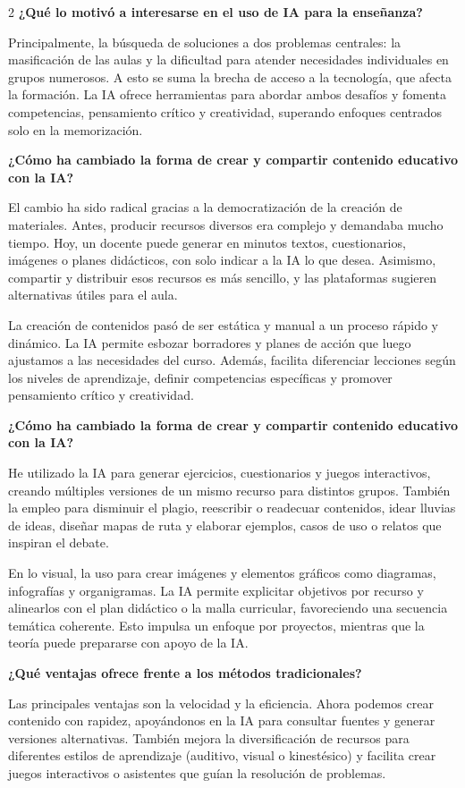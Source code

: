 \documentclass[12pt,spanish,Letterpaper,openany]{book}
\begin{document}
\begin {multicols}{2}
\textbf{¿Qué lo motivó a interesarse en el uso de IA para la enseñanza?}

Principalmente, la búsqueda de soluciones a dos problemas centrales: la masificación de las aulas y la dificultad para atender necesidades individuales en grupos numerosos. A esto se suma la brecha de acceso a la tecnología, que afecta la formación. La IA ofrece herramientas para abordar ambos desafíos y fomenta competencias, pensamiento crítico y creatividad, superando enfoques centrados solo en la memorización.

\textbf{¿Cómo ha cambiado la forma de crear y compartir contenido educativo con la IA?}

El cambio ha sido radical gracias a la democratización de la creación de materiales. Antes, producir recursos diversos era complejo y demandaba mucho tiempo. Hoy, un docente puede generar en minutos textos, cuestionarios, imágenes o planes didácticos, con solo indicar a la IA lo que desea. Asimismo, compartir y distribuir esos recursos es más sencillo, y las plataformas sugieren alternativas útiles para el aula.

La creación de contenidos pasó de ser estática y manual a un proceso rápido y dinámico. La IA permite esbozar borradores y planes de acción que luego ajustamos a las necesidades del curso. Además, facilita diferenciar lecciones según los niveles de aprendizaje, definir competencias específicas y promover pensamiento crítico y creatividad.

\textbf{¿Cómo ha cambiado la forma de crear y compartir contenido educativo con la IA?}

He utilizado la IA para generar ejercicios, cuestionarios y juegos interactivos, creando múltiples versiones de un mismo recurso para distintos grupos. También la empleo para disminuir el plagio, reescribir o readecuar contenidos, idear lluvias de ideas, diseñar mapas de ruta y elaborar ejemplos, casos de uso o relatos que inspiran el debate.

En lo visual, la uso para crear imágenes y elementos gráficos como diagramas, infografías y organigramas. La IA permite explicitar objetivos por recurso y alinearlos con el plan didáctico o la malla curricular, favoreciendo una secuencia temática coherente. Esto impulsa un enfoque por proyectos, mientras que la teoría puede prepararse con apoyo de la IA.

\textbf{¿Qué ventajas ofrece frente a los métodos tradicionales?}

Las principales ventajas son la velocidad y la eficiencia. Ahora podemos crear contenido con rapidez, apoyándonos en la IA para consultar fuentes y generar versiones alternativas. También mejora la diversificación de recursos para diferentes estilos de aprendizaje (auditivo, visual o kinestésico) y facilita crear juegos interactivos o asistentes que guían la resolución de problemas.


\end{multicols}
\end{document}
